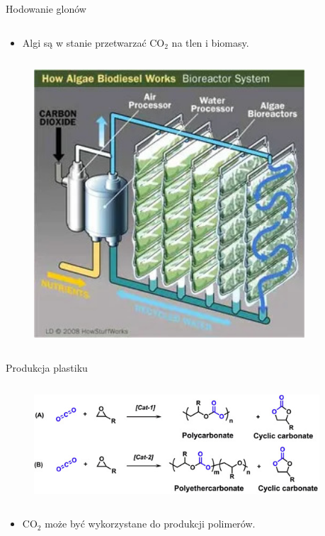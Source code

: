\begin{columnframe}{Hodowanie glonów}
    \begin{column}{0.5\textwidth}
        \begin{itemize}
            \item Algi są w stanie przetwarzać CO$_2$ na tlen i biomasy.
        \end{itemize}
    \end{column}
    \begin{column}{0.5\textwidth}
        \begin{figure}
            \centering
            \includegraphics[width=0.9\textwidth, frame]{images/algae_biodiesel.jpg}
        \end{figure}
    \end{column}
\end{columnframe}

\begin{columnframe}{Produkcja plastiku}
    \begin{column}{0.5\textwidth}
        \begin{figure}
            \centering
            \includegraphics[width=0.95\textwidth, frame]{images/plastic_from_co2.jpg}
        \end{figure}
    \end{column}
    \begin{column}{0.5\textwidth}
        \begin{itemize}
            \item CO$_2$ może być wykorzystane do produkcji polimerów.
        \end{itemize}
    \end{column}
\end{columnframe}

